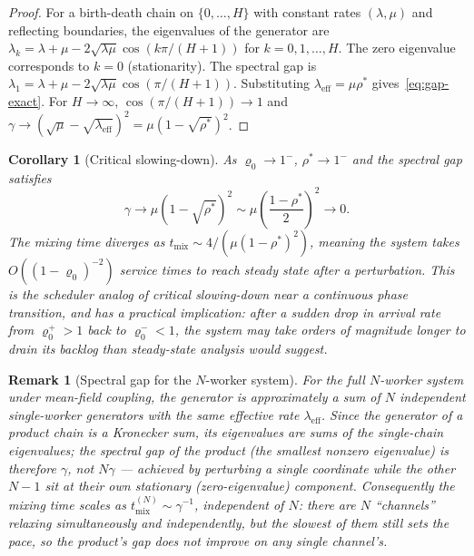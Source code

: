 \documentclass[11pt,a4paper]{report}
\newtheorem{corollary}[theorem]{Corollary}
\newtheorem{remark}{Remark}[section]
\newcommand{\rhostar}{\rho^{*}}
\newcommand{\rhozero}{\varrho_0}
\begin{document}
\begin{proof}
For a birth-death chain on $\{0,\ldots,H\}$ with constant rates
$(\lambda,\mu)$ and reflecting boundaries, the eigenvalues of the
generator are
$\lambda_k = \lambda + \mu - 2\sqrt{\lambda\mu}\cos(k\pi/(H+1))$
for $k = 0, 1, \ldots, H$.
The zero eigenvalue corresponds to $k=0$ (stationarity).
The spectral gap is $\lambda_1 = \lambda + \mu - 2\sqrt{\lambda\mu}\cos(\pi/(H+1))$.
Substituting $\lambda_{\mathrm{eff}} = \mu\rhostar$ gives~\eqref{eq:gap-exact}.
For $H \to \infty$, $\cos(\pi/(H+1)) \to 1$ and
$\gamma \to (\sqrt{\mu} - \sqrt{\lambda_{\mathrm{eff}}})^2 = \mu(1-\sqrt{\rhostar})^2$.
\end{proof}

\begin{corollary}[Critical slowing-down]
\label{cor:csd}
As $\rhozero \to 1^-$, $\rhostar \to 1^-$ and the spectral gap satisfies
\[
  \gamma \to \mu(1 - \sqrt{\rhostar})^2 \sim \mu\left(\frac{1-\rhostar}{2}\right)^2 \to 0.
\]
The mixing time diverges as $t_{\mathrm{mix}} \sim 4/(\mu(1-\rhostar)^2)$,
meaning the system takes $O((1-\rhozero)^{-2})$ service times to reach
steady state after a perturbation.
This is the scheduler analog of \emph{critical slowing-down} near a
continuous phase transition, and has a practical implication:
after a sudden drop in arrival rate from $\rhozero^+ > 1$ back to
$\rhozero^- < 1$, the system may take orders of magnitude longer to
drain its backlog than steady-state analysis would suggest.
\end{corollary}

\begin{remark}[Spectral gap for the $N$-worker system]
For the full $N$-worker system under mean-field coupling, the generator
is approximately a sum of $N$ independent single-worker generators with
the same effective rate $\lambda_{\mathrm{eff}}$. Since the generator of
a product chain is a Kronecker \emph{sum}, its eigenvalues are sums of
the single-chain eigenvalues; the spectral gap of the product (the
smallest nonzero eigenvalue) is therefore $\gamma$, not $N\gamma$ ---
achieved by perturbing a single coordinate while the other $N-1$ sit at
their own stationary (zero-eigenvalue) component. Consequently the
mixing time scales as $t_{\mathrm{mix}}^{(N)} \sim \gamma^{-1}$,
independent of $N$: there are $N$ ``channels'' relaxing simultaneously
and independently, but the slowest of them still sets the pace, so the
product's gap does not improve on any single channel's.
\end{remark}
\end{document}
